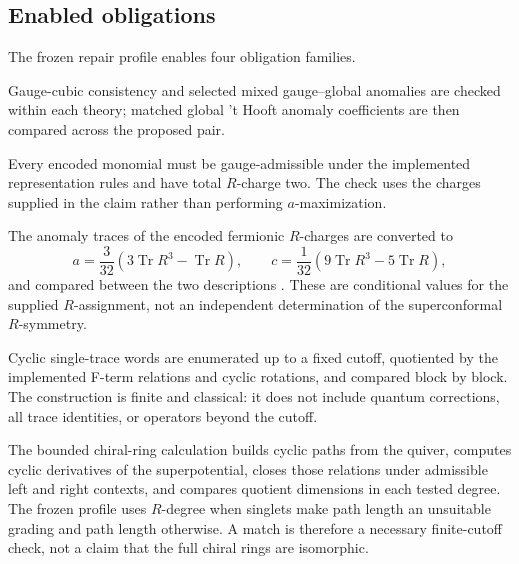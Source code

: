 \documentclass[11pt]{scrartcl}
\begin{document}
\subsection{Enabled obligations}
\label{sec:obligations}

The frozen repair profile enables four obligation families.

\begin{description}[leftmargin=2.7cm,style=nextline,itemsep=0.35em]
  \item[Anomalies.] Gauge-cubic consistency and selected mixed gauge--global
  anomalies are checked within each theory; matched global 't Hooft anomaly
  coefficients are then compared across the proposed pair.
  \item[Superpotential.] Every encoded monomial must be gauge-admissible under
  the implemented representation rules and have total $R$-charge two.  The
  check uses the charges supplied in the claim rather than performing
  $a$-maximization.
  \item[Central charges.] The anomaly traces of the encoded fermionic
  $R$-charges are converted to
  \begin{equation}
    a=\frac{3}{32}\!\left(3\operatorname{Tr}R^3-\operatorname{Tr}R\right),
    \qquad
    c=\frac{1}{32}\!\left(9\operatorname{Tr}R^3-5\operatorname{Tr}R\right),
  \end{equation}
  and compared between the two descriptions \cite{Anselmi:1997am}.  These are
  conditional values for the supplied $R$-assignment, not an independent
  determination of the superconformal $R$-symmetry.
  \item[Bounded chiral ring.] Cyclic single-trace words are enumerated up to a
  fixed cutoff, quotiented by the implemented F-term relations and cyclic
  rotations, and compared block by block.  The construction is finite and
  classical: it does not include quantum corrections, all trace identities, or
  operators beyond the cutoff.
\end{description}

The bounded chiral-ring calculation builds cyclic paths from the quiver,
computes cyclic derivatives of the superpotential, closes those relations under
admissible left and right contexts, and compares quotient dimensions in each
tested degree.  The frozen profile uses $R$-degree when singlets make path
length an unsuitable grading and path length otherwise.  A match is therefore
a necessary finite-cutoff check, not a claim that the full chiral rings are
isomorphic.
\end{document}
